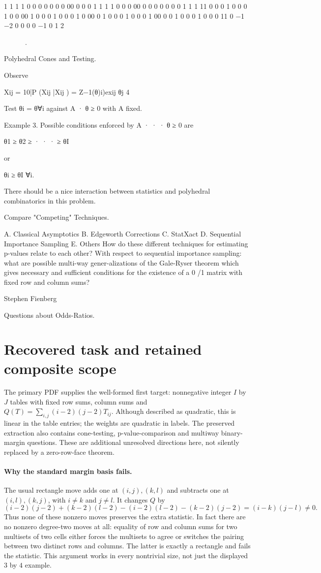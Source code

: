 \documentclass[11pt]{article}
\begin{document}
1 1 1 1 0 0 0 0 0 0 0 00 0 0 0 1 1 1 1 0 0 0 00 0 0 0 0 0 0 0 1 1 1 11 0 0 0 1 0 0 0 1 0 0 00 1 0 0 0 1 0 0 0 1 0 00 0 1 0 0 0 1 0 0 0 1 00 0 0 1 0 0 0 1 0 0 0 11 0 −1 −2 0 0 0 0 −1 0 1 2

.

Polyhedral Cones and Testing.

Observe

Xij = {10|P (Xij |Xij ) = Z−1(θ)i)exij θj }4

Test θi = θ∀i against A · θ ≥ 0 with A fixed.

Example 3. Possible conditions enforced by A · · · θ ≥ 0 are

θ1 ≥ θ2 ≥ · · · ≥ θI

or

θi ≥ θI ∀i.

There should be a nice interaction between statistics and polyhedral combinatorics in this problem.

Compare "Competing" Techniques.

A. Classical Asymptotics B. Edgeworth Corrections C. StatXact D. Sequential Importance Sampling E. Others How do these different techniques for estimating p-values relate to each other? With respect to sequential importance sampling: what are possible multi-way gener-alizations of the Gale-Ryser theorem which gives necessary and sufficient conditions for the existence of a 0 /1 matrix with fixed row and column sums?

Stephen Fienberg

Questions about Odds-Ratios.

\section{Recovered task and retained composite scope}
The primary PDF supplies the well-formed first target: nonnegative integer
$I$ by $J$ tables with fixed row sums, column sums and
$Q(T)=\sum_{i,j}(i-2)(j-2)T_{ij}$. Although described as quadratic,
this is linear in the table entries; the weights are quadratic in labels.
The preserved extraction also contains cone-testing, p-value-comparison
and multiway binary-margin questions. These are additional unresolved
directions here, not silently replaced by a zero-row-face theorem.

\paragraph{Why the standard margin basis fails.}
The usual rectangle move adds one at $(i,j),(k,l)$ and subtracts one at
$(i,l),(k,j)$, with $i\ne k$ and $j\ne l$. It changes $Q$ by
\[
(i-2)(j-2)+(k-2)(l-2)-(i-2)(l-2)-(k-2)(j-2)
=(i-k)(j-l)\ne0.
\]
Thus none of these nonzero moves preserves the extra statistic. In fact
there are no nonzero degree-two moves at all: equality of row and column
sums for two multisets of two cells either forces the multisets to agree
or switches the pairing between two distinct rows and columns. The latter
is exactly a rectangle and fails the statistic. This argument works in
every nontrivial size, not just the displayed $3$ by $4$ example.
\end{document}
